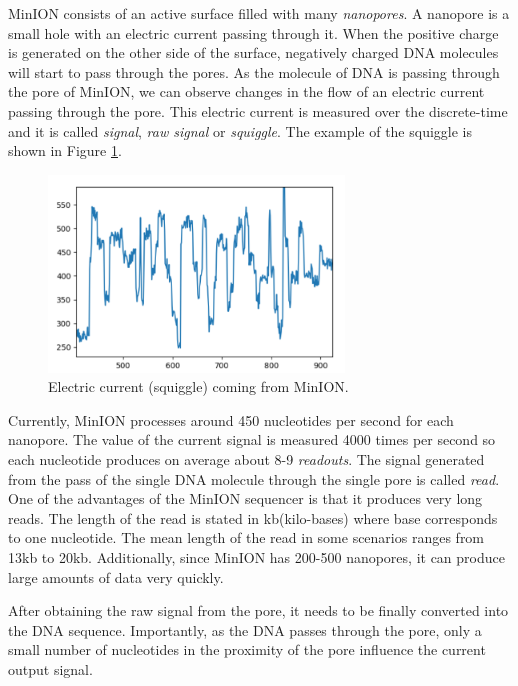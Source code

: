 MinION consists of an active surface filled with many \textit{nanopores}. A nanopore
is a small hole with an electric current passing through it. When the positive charge
is generated on the other side of the surface, negatively charged DNA molecules
will start to pass through the pores. As the molecule of DNA is passing through the pore of
MinION, we can observe changes in the flow of an electric current passing through the pore.
This electric current is measured over the discrete-time and it is called \textit{signal},
\textit{raw signal} or \textit{squiggle}. The example of the squiggle is shown in Figure \ref{obr:minIonCurrent}.

\begin{figure}
\centerline{\includegraphics[width=0.7\textwidth, height=0.3\textheight]{images/signal}}
\caption[MinION signal]{Electric current (squiggle) coming from MinION.}
\label{obr:minIonCurrent}
\end{figure}

Currently, MinION processes around 450 nucleotides per second for each nanopore.
The value of the current signal is measured 4000 times per second so each
nucleotide produces on average about 8-9 \textit{readouts}. The signal
generated from the pass of the single DNA molecule through the single pore is called \textit{read}.
One of the advantages of the MinION sequencer is that it produces very long reads.
The length of the read is stated in kb(kilo-bases) where base corresponds to one nucleotide.
The mean length of the read in some scenarios ranges from 13kb to 20kb. Additionally,
since MinION has 200-500 nanopores, it can produce large amounts of
data very quickly.


After obtaining the raw signal from the pore, it needs to be finally converted into the DNA
sequence. Importantly, as the DNA passes through the pore, only a small
number of nucleotides in the proximity of the pore influence the current output signal.

